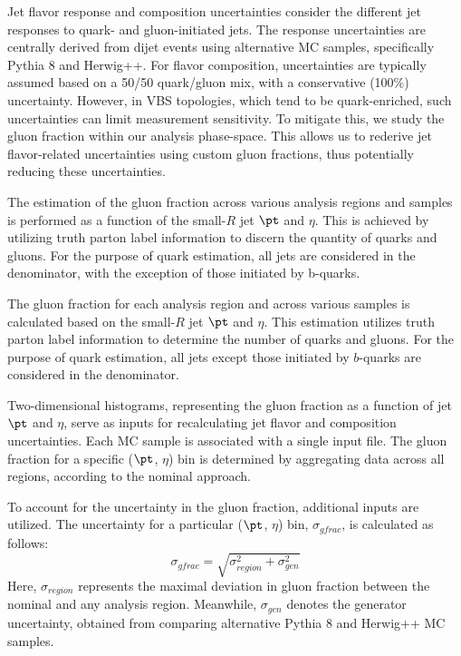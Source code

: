\label{subsec:bkg_uncer_qg}

Jet flavor response and composition uncertainties consider the different jet responses to quark- and gluon-initiated jets. 
The response uncertainties are centrally derived from dijet events using alternative MC samples, specifically Pythia 8 and Herwig++. 
For flavor composition, uncertainties are typically assumed based on a 50/50 quark/gluon mix, with a conservative (100\%) uncertainty. 
However, in VBS topologies, which tend to be quark-enriched, such uncertainties can limit measurement sensitivity. 
To mitigate this, we study the gluon fraction within our analysis phase-space. 
This allows us to rederive jet flavor-related uncertainties using custom gluon fractions, thus potentially reducing these uncertainties.

The estimation of the gluon fraction across various analysis regions and samples is performed as a function of the small-\(R\) jet \(\pt\) and \(\eta\). This is achieved by utilizing truth parton label information to discern the quantity of quarks and gluons. For the purpose of quark estimation, all jets are considered in the denominator, with the exception of those initiated by b-quarks.

The gluon fraction for each analysis region and across various samples is calculated based on the small-$R$ jet $\pt$ and $\eta$. 
This estimation utilizes truth parton label information to determine the number of quarks and gluons. 
For the purpose of quark estimation, all jets except those initiated by $b$-quarks are considered in the denominator.

Two-dimensional histograms, representing the gluon fraction as a function of jet $\pt$ and $\eta$, serve as inputs for recalculating jet flavor and composition uncertainties. Each MC sample is associated with a single input file. 
The gluon fraction for a specific ($\pt$, $\eta$) bin is determined by aggregating data across all regions, according to the nominal approach.

To account for the uncertainty in the gluon fraction, additional inputs are utilized. The uncertainty for a particular ($\pt$, $\eta$) bin, $\sigma_{gfrac}$, is calculated as follows:
\[
\sigma_{gfrac} = \sqrt{\sigma_{region}^{2} + \sigma_{gen}^{2}}
\]
Here, \(\sigma_{region}\) represents the maximal deviation in gluon fraction between the nominal and any analysis region. Meanwhile, \(\sigma_{gen}\) denotes the generator uncertainty, obtained from comparing alternative Pythia 8 and Herwig++ MC samples.


